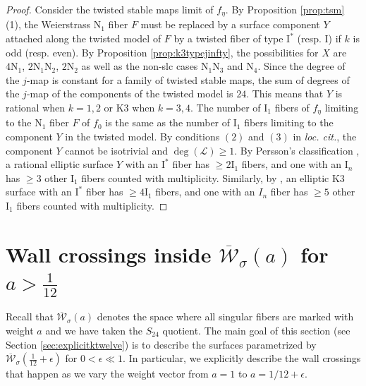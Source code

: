 \documentclass[11pt]{amsart}
\theoremstyle{definition}
\theoremstyle{remark}
\newcommand{\calW}{\mathcal W}
\newcommand{\ska}{\overline{\calW}_\sigma(a)}
\newcommand{\ktwelve}{\overline{\calW}_\sigma({\frac{1}{12}+\epsilon})}
\begin{document}
	\begin{proof}Consider the twisted stable maps limit of $f_\eta$. By Proposition \ref{prop:tsm} (1), the Weierstrass $\mathrm{N}_1$ fiber $F$ must be replaced by a surface component $Y$ attached along the twisted model of $F$ by a twisted fiber of type $\mathrm{I}^*$ (resp. $\mathrm{I}$) if $k$ is odd (resp. even). By Proposition \ref{prop:k3typejinfty}, the possibilities for $X$ are $4\mathrm{N}_1$, $2\mathrm{N}_1\mathrm{N}_2$, $2\mathrm{N}_2$ as well as the non-slc cases $\mathrm{N}_1\mathrm{N}_3$ and $\mathrm{N}_4$. Since the degree of the $j$-map is constant for a family of twisted stable maps, the sum of degrees of the $j$-map of the components of the twisted model is $24$. This means that $Y$ is rational when $k = 1,2$ or K3 when $k = 3,4$. The number of $\mathrm{I}_1$ fibers of $f_\eta$ limiting to the $\mathrm{N}_1$ fiber $F$ of $f_0$ is the same as the number of $\mathrm{I}_1$ fibers limiting to the component $Y$ in the twisted model. By conditions $(2)$ and $(3)$ in \emph{loc. cit.}, the component $Y$ cannot be isotrivial and $\deg(\mathscr{L}) \geq 1$. By Persson's classification \cite{persson}, a rational elliptic surface $Y$ with an $\mathrm{I}^*$ fiber has $\geq 2\mathrm{I}_1$ fibers, and one with an $\mathrm{I}_n$ has $\geq 3$ other $\mathrm{I}_1$ fibers counted with multiplicity. Similarly, by \cite[Theorem 1.1 and 1.2]{shioda}, an elliptic K3 surface with an $\mathrm{I}^*$ fiber has $\geq 4\mathrm{I}_1$ fibers, and one with an $I_n$ fiber has $\geq 5$ other $\mathrm{I}_1$ fibers counted with multiplicity.   \end{proof}
	
	
	
	
	
	
	
	
	
	
	\section{Wall crossings inside $\ska$ for $a > \frac{1}{12}$}\label{sec:firstwall}
	
	Recall that $\ska$ denotes the space where all singular fibers are marked with weight $a$ and we have taken the $S_{24}$ quotient. The main goal of this section (see Section \ref{sec:explicitktwelve}) is to describe the surfaces parametrized by $\ktwelve$ for $0 < \epsilon \ll 1$. In particular, we explicitly describe the wall crossings that happen as we vary the weight vector from $a = 1$ to $a = 1/12 + \epsilon$.
	
\end{document}
